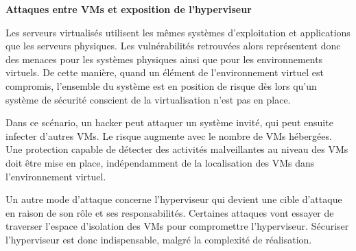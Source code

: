 \textbf{Attaques entre VMs et exposition de l'hyperviseur}

Les serveurs virtualisés utilisent les mêmes systèmes d'exploitation et applications que les serveurs physiques. Les vulnérabilités retrouvées alors représentent donc des menaces pour les systèmes physiques ainsi que pour les environnements virtuels. De cette manière, quand un élément de l'environnement virtuel est compromis, l'ensemble du système est en position de risque dès lors qu'un système de sécurité conscient de la virtualisation n'est pas en place. 

Dans ce scénario, un hacker peut attaquer un système invité, qui peut ensuite infecter d'autres VMs. Le risque augmente avec le nombre de VMs hébergées. Une protection capable de détecter des activités malveillantes au niveau des VMs doit être mise en place, indépendamment de la localisation des VMs dans l'environnement virtuel.

Un autre mode d'attaque concerne l'hyperviseur qui devient une cible d'attaque en raison de son rôle et ses responsabilités. Certaines attaques vont essayer de traverser l'espace d'isolation des VMs pour compromettre l'hyperviseur. Sécuriser l'hyperviseur est donc indispensable, malgré la complexité de réalisation.

